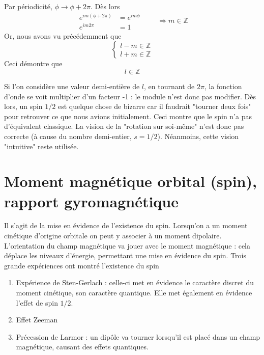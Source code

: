 	Par périodicité, $\phi\rightarrow \phi+2\pi$. Dès lors
	\begin{equation}
	\begin{array}{ll}
	e^{im(\phi+2\pi)} &= e^{im\phi}\\
	e^{im2\pi} &= 1
	\end{array}\qquad \Longrightarrow m \in\mathbb{Z}
	\end{equation}
	Or, nous avons vu précédemment que
	\begin{equation}
	\left\{\begin{array}{ll}
	l-m \in \mathbb{Z}\\
	l+m \in \mathbb{Z}	
	\end{array}\right.
	\end{equation}
	Ceci démontre que 
	\begin{equation}
	l \in\mathbb{Z}
	\end{equation}
	
	Si l'on considère une valeur demi-entière de $l$, en tournant de $2\pi$, la 
	fonction d'onde se voit multiplier d'un facteur -1 : le module n'est donc pas 
	modifier. Dès lors, un spin $1/2$ est quelque chose de bizarre car il faudrait 
	"tourner deux fois" pour retrouver ce que nous avions initialement. Ceci montre 
	que le spin n'a pas d'équivalent classique. La vision de la "rotation sur soi-même" 
	n'est donc pas correcte (à cause du nombre demi-entier, $s=1/2$). Néanmoins, cette 
	vision "intuitive" reste utilisée.
	
	\section{Moment magnétique orbital (spin), rapport gyromagnétique}
	Il s'agit de la mise en évidence de l'existence du spin. Lorsqu'on a un 
	moment cinétique d'origine orbitale on peut y associer à un moment dipolaire. 
	L'orientation du champ magnétique va jouer avec le moment magnétique : cela 
	déplace les niveaux d'énergie, permettant une mise en évidence du spin. Trois 
	grande expériences ont montré l'existence du spin
	\begin{enumerate}
	\item Expérience de Sten-Gerlach : celle-ci met en évidence le caractère discret 
	du moment cinétique, son caractère quantique. Elle met également en évidence l'effet 
	de spin $1/2$.
	\item Effet Zeeman 
	\item Précession de Larmor : un dipôle va tourner lorsqu'il est placé dans un 
	champ magnétique, causant des effets quantiques.
	\end{enumerate}
	
